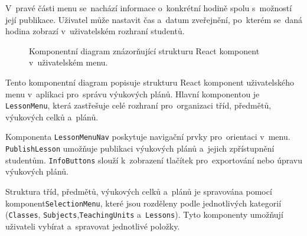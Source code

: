 \documentclass[male,czech,api_bc]{kitheses}
\begin{document}
\newpage

V~pravé části menu se~nachází informace o~konkrétní hodině spolu s~možností její publikace. Uživatel může nastavit čas a~datum zveřejnění, po~kterém se~daná hodina zobrazí v~uživatelském rozhraní studentů.

\begin{figure}[H]
	\centering
	\caption{Komponentní diagram znázorňující strukturu React komponent v~uživatelském menu.}
	\label{fig:component-diagram-react-2}
\end{figure}

Tento komponentní diagram popisuje strukturu React komponent uživatelského menu v~aplikaci pro~správu výukových plánů. Hlavní komponentou je \texttt{LessonMenu}, která zastřešuje celé rozhraní pro~organizaci tříd, předmětů, výukových celků a~plánů.

Komponenta \texttt{LessonMenuNav} poskytuje navigační prvky pro~orientaci v~menu. \texttt{PublishLesson} umožňuje publikaci výukových plánů a~jejich zpřístupnění studentům. \texttt{InfoButtons} slouží k~zobrazení tlačítek pro~exportování nebo úpravu výukových plánů.

Struktura tříd, předmětů, výukových celků a~plánů je spravována pomocí komponent\break\texttt{SelectionMenu}, které jsou rozděleny podle jednotlivých kategorií (\texttt{Classes}, \texttt{Subjects},\break\texttt{TeachingUnits} a~\texttt{Lessons}). Tyto komponenty umožňují uživateli vybírat a~spravovat jednotlivé položky.
\end{document}
